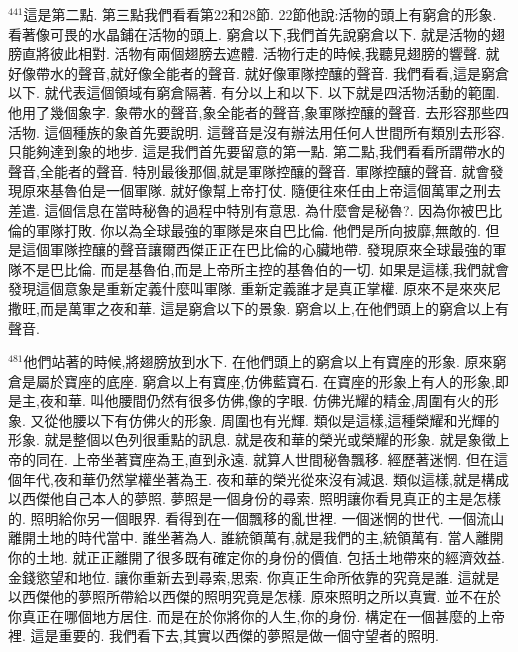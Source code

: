 \documentclass{book}
\begin{document}
$^{441}$這是第二點.
第三點我們看看第22和28節.
22節他說:活物的頭上有窮倉的形象.
看著像可畏的水晶鋪在活物的頭上.
窮倉以下,我們首先說窮倉以下.
就是活物的翅膀直將彼此相對.
活物有兩個翅膀去遮體.
活物行走的時候,我聽見翅膀的響聲.
就好像帶水的聲音,就好像全能者的聲音.
就好像軍隊控釀的聲音.
我們看看,這是窮倉以下.
就代表這個領域有窮倉隔著.
有分以上和以下.
以下就是四活物活動的範圍.
他用了幾個象字.
象帶水的聲音,象全能者的聲音,象軍隊控釀的聲音.
去形容那些四活物.
這個種族的象首先要說明.
這聲音是沒有辦法用任何人世間所有類別去形容.
只能夠達到象的地步.
這是我們首先要留意的第一點.
第二點,我們看看所謂帶水的聲音,全能者的聲音.
特別最後那個,就是軍隊控釀的聲音.
軍隊控釀的聲音.
就會發現原來基魯伯是一個軍隊.
就好像幫上帝打仗.
隨便往來任由上帝這個萬軍之刑去差遣.
這個信息在當時秘魯的過程中特別有意思.
為什麼會是秘魯?.
因為你被巴比倫的軍隊打敗.
你以為全球最強的軍隊是來自巴比倫.
他們是所向披靡,無敵的.
但是這個軍隊控釀的聲音讓爾西傑正正在巴比倫的心臟地帶.
發現原來全球最強的軍隊不是巴比倫.
而是基魯伯,而是上帝所主控的基魯伯的一切.
如果是這樣,我們就會發現這個意象是重新定義什麼叫軍隊.
重新定義誰才是真正掌權.
原來不是來夾尼撒旺,而是萬軍之夜和華.
這是窮倉以下的景象.
窮倉以上,在他們頭上的窮倉以上有聲音.

$^{481}$他們站著的時候,將翅膀放到水下.
在他們頭上的窮倉以上有寶座的形象.
原來窮倉是屬於寶座的底座.
窮倉以上有寶座,仿佛藍寶石.
在寶座的形象上有人的形象,即是主,夜和華.
叫他腰間仍然有很多仿佛,像的字眼.
仿佛光耀的精金,周圍有火的形象.
又從他腰以下有仿佛火的形象.
周圍也有光輝.
類似是這樣,這種榮耀和光輝的形象.
就是整個以色列很重點的訊息.
就是夜和華的榮光或榮耀的形象.
就是象徵上帝的同在.
上帝坐著寶座為王,直到永遠.
就算人世間秘魯飄移.
經歷著迷惘.
但在這個年代,夜和華仍然掌權坐著為王.
夜和華的榮光從來沒有減退.
類似這樣,就是構成以西傑他自己本人的夢照.
夢照是一個身份的尋索.
照明讓你看見真正的主是怎樣的.
照明給你另一個眼界.
看得到在一個飄移的亂世裡.
一個迷惘的世代.
一個流山離開土地的時代當中.
誰坐著為人.
誰統領萬有,就是我們的主,統領萬有.
當人離開你的土地.
就正正離開了很多既有確定你的身份的價值.
包括土地帶來的經濟效益.
金錢慾望和地位.
讓你重新去到尋索,思索.
你真正生命所依靠的究竟是誰.
這就是以西傑他的夢照所帶給以西傑的照明究竟是怎樣.
原來照明之所以真實.
並不在於你真正在哪個地方居住.
而是在於你將你的人生,你的身份.
構定在一個甚麼的上帝裡.
這是重要的.
我們看下去,其實以西傑的夢照是做一個守望者的照明.
\end{document}
